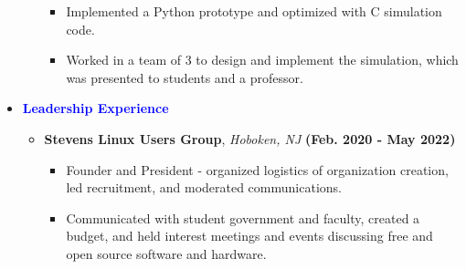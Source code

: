 \documentclass[11pt]{article}
\begin{document}
\begin{flushleft}
\begin{itemize}
\begin{itemize}
\begin{itemize}
                    \item Implemented a Python prototype and optimized with C simulation code.
                    \item Worked in a team of 3 to design and implement the simulation, which was presented to students and a professor.
                \end{itemize}
        \end{itemize}
    \item[] \Large \textcolor{blue}{\textbf{Leadership Experience}} \normalsize
        \begin{itemize}
            \item \textbf{Stevens Linux Users Group}, \textit{Hoboken, NJ} \hfill{\textbf{(Feb. 2020 - May 2022)}}
                \begin{itemize}
                    \item Founder and President - organized logistics of organization creation, led recruitment, and moderated communications.
                    \item Communicated with student government and faculty, created a budget, and held interest meetings and events discussing free and open source software and hardware.
                \end{itemize}
        \end{itemize}
\end{itemize}

\end{flushleft}
\end{document}
